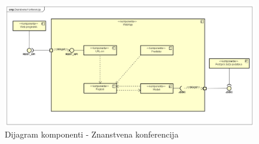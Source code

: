 			\begin{figure}[H]
			 	\includegraphics[width= 15 cm, height= 25 cm, keepaspectratio]{dijagrami/Component_Diagram_Znanstvena_Konferencija.png} 
			 	\centering
			 	\caption{Dijagram komponenti - Znanstvena konferencija}
			 	\label{fig:act4}
			 \end{figure}